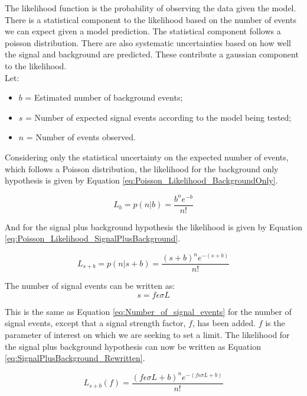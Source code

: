 The likelihood function is the probability of observing the data given the
model. There is a statistical component to the likelihood based on the number of
events we can expect given a model prediction. The statistical component follows
a poisson distribution. There are also systematic uncertainties based on how 
well the signal and background are predicted. These contribute a gaussian
component to the likelihood. \\

Let: 
\begin{itemize}
\item $b$ = Estimated number of background events;
\item $s$ = Number of expected signal events according to the model being
tested;
\item $n$ = Number of events observed.
\end{itemize}

Considering only the statistical uncertainty on the expected number of events, 
which follows a Poisson distribution, the likelihood for the background only 
hypothesis is given by Equation \ref{eq:Poisson_Likelihood_BackgroundOnly}.

\begin{equation}
L_{b} = p(n|b) = \frac{b^{n}e^{-b}}{n!} 
\label{eq:Poisson_Likelihood_BackgroundOnly}
\end{equation}

And for the signal plus background hypothesis the likelihood is given by Equation
\ref{eq:Poisson_Likelihood_SignalPlusBackground}.

\begin{equation}
L_{s+b} = p(n|s+b) = \frac{(s+b)^{n}e^{-(s+b)}}{n!} 
\label{eq:Poisson_Likelihood_SignalPlusBackground}
\end{equation}

The number of signal events can be written as:
\begin{equation}
s = f\epsilon\sigma L
\label{eq:fsig}
\end{equation}

This is the same as Equation \ref{eq:Number_of_signal_events} for the number of 
signal events, except that a signal strength factor, $f$, has been added. $f$ is 
the parameter of interest on which we are seeking to set a limit. The likelihood 
for the signal plus background hypothesis can now be written as Equation 
\ref{eq:SignalPlusBackground_Rewritten}. 

\begin{equation}
L_{s+b}(f) = \frac{(f\epsilon \sigma L + b)^{n} e^{-(f\epsilon \sigma L + b)}}{n!} 
\label{eq:SignalPlusBackground_Rewritten}
\end{equation}


